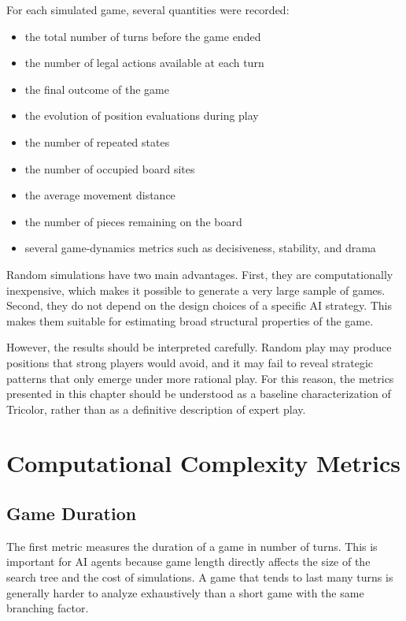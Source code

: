 For each simulated game, several quantities were recorded:

\begin{itemize}
    \item the total number of turns before the game ended
    \item the number of legal actions available at each turn
    \item the final outcome of the game
    \item the evolution of position evaluations during play
    \item the number of repeated states
    \item the number of occupied board sites
    \item the average movement distance
    \item the number of pieces remaining on the board
    \item several game-dynamics metrics such as decisiveness, stability, and drama
\end{itemize}

Random simulations have two main advantages. First, they are computationally inexpensive, which makes it possible to generate a very large sample of games. Second, they do not depend on the design choices of a specific AI strategy. This makes them suitable for estimating broad structural properties of the game.

However, the results should be interpreted carefully. Random play may produce positions that strong players would avoid, and it may fail to reveal strategic patterns that only emerge under more rational play. For this reason, the metrics presented in this chapter should be understood as a baseline characterization of Tricolor, rather than as a definitive description of expert play.

\section{Computational Complexity Metrics}

\subsection{Game Duration}

The first metric measures the duration of a game in number of turns. This is important for AI agents because game length directly affects the size of the search tree and the cost of simulations. A game that tends to last many turns is generally harder to analyze exhaustively than a short game with the same branching factor.

